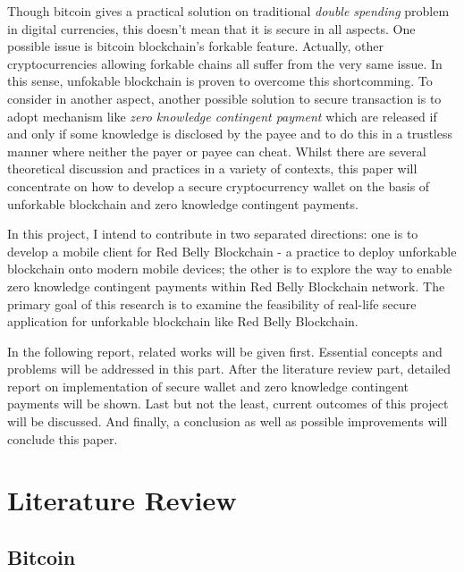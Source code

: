 \documentclass[12pt]{article}
\begin{document}
Though bitcoin gives a practical solution on traditional \textit{double spending} problem in digital currencies, this doesn't mean that it is secure in all aspects. One possible issue is bitcoin blockchain's forkable feature. Actually, other cryptocurrencies allowing forkable chains all suffer from the very same issue. In this sense, unfokable blockchain is proven to overcome this shortcomming\cite{DBLP:journals/corr/CrainGLR17}. To consider in another aspect, another possible solution to secure transaction is to adopt mechanism like \textit{zero knowledge contingent payment} which are released if and only if some knowledge is disclosed by the payee and to do this in a trustless manner where neither the payer or payee can cheat\cite{wiki2011zero}\cite{sasson2014zerocash}. Whilst there are several theoretical discussion and practices in a variety of contexts, this paper will concentrate on how to develop a secure cryptocurrency wallet on the basis of unforkable blockchain and zero knowledge contingent payments. 

In this project, I intend to contribute in two separated directions: one is to develop a mobile client for Red Belly Blockchain - a practice to deploy unforkable blockchain onto modern mobile devices; the other is to explore the way to enable zero knowledge contingent payments within Red Belly Blockchain network. The primary goal of this research is to examine the feasibility of real-life secure application for unforkable blockchain like Red Belly Blockchain.

In the following report, related works will be given first. Essential concepts and problems will be addressed in this part. After the literature review part, detailed report on implementation of secure wallet and zero knowledge contingent payments will be shown. Last but not the least, current outcomes of this project will be discussed. And finally, a conclusion as well as possible improvements will conclude this paper.

\section{Literature Review}
\label{sec:Literature Review}

\subsection{Bitcoin}
\end{document}

